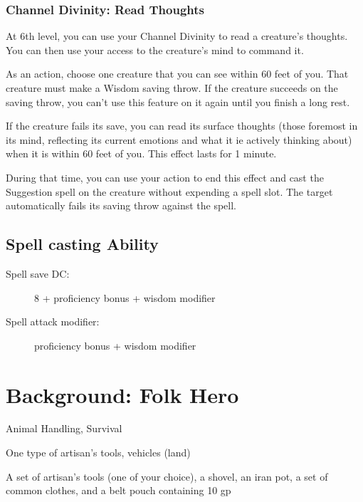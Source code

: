 \documentclass[letterpaper,10pt,twoside,twocolumn,openany]{book}
\begin{document}
\subsubsection{Channel Divinity: Read Thoughts}

At 6th level, you can use your Channel Divinity to read a creature's thoughts. You can then use your access to the creature's mind to command it.

As an action, choose one creature that you can see within 60 feet of you. That creature must make a Wisdom saving throw. If the creature succeeds on the saving throw, you can't use this feature on it again until you finish a long rest.

If the creature fails its save, you can read its surface thoughts (those foremost in its mind, reflecting its current emotions and what it ie actively thinking about) when it is within 60 feet of you. This effect lasts for 1 minute.

During that time, you can use your action to end this effect and cast the Suggestion spell on the creature without expending a spell slot. The target automatically fails its saving throw against the spell.

\subsection{Spell casting Ability}

\begin{description}
	\item[Spell save DC:] 8 + proficiency bonus + wisdom modifier 
	\item[Spell attack modifier:] proficiency bonus + wisdom modifier
\end{description}

\section{Background: Folk Hero}

\begin{description}[font=\normalfont\textbf,noitemsep,topsep=1ex,leftmargin=1em]
	\item[Ski1l Proficiencies:] Animal Handling, Survival
	\item[Tool Proficiencies:] One type of artisan's tools,	vehicles (land)
	\item[Equipment:] A set of artisan's tools (one of your choice), a shovel, an iran pot, a set of common clothes, and a belt pouch containing 10 gp
\end{description}
\end{document}
